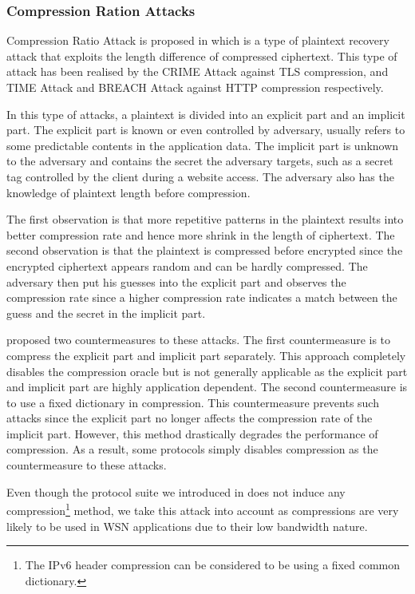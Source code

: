 \subsubsection{Compression Ration Attacks}

Compression Ratio Attack is proposed in \cite{CompressionRatioAttack} which is a type of plaintext recovery attack that exploits the length difference of compressed ciphertext. This type of attack has been realised by the CRIME\cite{CRIME} Attack against TLS compression, and TIME\cite{TIME} Attack and BREACH\cite{BREACH} Attack against HTTP compression respectively. 

In this type of attacks, a plaintext is divided into an explicit part and an implicit part. The explicit part is known or even controlled by adversary, usually refers to some predictable contents in the application data. The implicit part is unknown to the adversary and contains the secret the adversary targets, such as a secret tag controlled by the client during a website access. The adversary also has the knowledge of plaintext length before compression.

The first observation is that more repetitive patterns in the plaintext results into better compression rate and hence more shrink in the length of ciphertext. The second observation is that the plaintext is compressed before encrypted since the encrypted ciphertext appears random and can be hardly compressed. The adversary then put his guesses into the explicit part and observes the compression rate since a higher compression rate indicates a match between the guess and the secret in the implicit part.

\cite{CompressionCountermeasure} proposed two countermeasures to these attacks. The first countermeasure is to compress the explicit part and implicit part separately. This approach completely disables the compression oracle but is not generally applicable as the explicit part and implicit part are highly application dependent. The second countermeasure is to use a fixed dictionary in compression. This countermeasure prevents such attacks since the explicit part no longer affects the compression rate of the implicit part. However, this method drastically degrades the performance of compression. As a result, some protocols simply disables compression as the countermeasure to these attacks.

Even though the protocol suite we introduced in  does not induce any compression\footnote{The IPv6 header compression can be considered to be using a fixed common dictionary.} method, we take this attack into account as compressions are very likely to be used in WSN applications due to their low bandwidth nature. 

